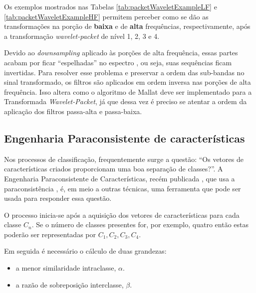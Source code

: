 \documentclass[a4paper,12pt,openright,oneside]{book}
\newenvironment{myenv}[1]
  {\begin{spacing}{#1}}
  {\end{spacing}}
\begin{document}
\begin{myenv}{1.5}
							\par Os exemplos mostrados nas Tabelas \ref{tab:packetWaveletExampleLF} e \ref{tab:packetWaveletExampleHF} permitem perceber como se dão as transformações na porção de \textbf{baixa} e de \textbf{alta} frequências, respectivamente, após a transformação \textit{wavelet-packet} de nível 1, 2, 3 e 4.
							
							\par Devido ao \textit{downsampling} aplicado às porções de alta frequência, essas partes acabam por ficar ``espelhadas'' no espectro \cite{Jensen_2001}, ou seja, suas sequências ficam invertidas. Para resolver esse problema e preservar a ordem das sub-bandas no sinal transformado, os filtros são aplicados em ordem inversa nas porções de alta frequência. Isso altera como o algoritmo de Mallat deve ser implementado para a Transformada \textit{Wavelet-Packet}, já que dessa vez é preciso se atentar a ordem da aplicação dos filtros passa-alta e passa-baixa.
							
							
				
				\subsection{Engenharia Paraconsistente de características}
					\par Nos processos de classificação, frequentemente surge a questão: ``Os vetores de características criados proporcionam uma boa separação de classes?''. A Engenharia Paraconsistente de Características, recém publicada \cite{8588433}, que usa a paraconsistência \cite{da1998elementos},  \cite{COSTA2000} é, em meio a outras técnicas, uma ferramenta que pode ser usada para responder essa questão.
					
					\par O processo inicia-se após a aquisição dos vetores de características para cada classe $C_n$. Se o número de classes presentes for, por exemplo, quatro então estas poderão ser representadas por $C_1, C_2, C_3, C_4$.
					\par Em seguida é necessário o cálculo de duas grandezas:
					
					\begin{itemize}
						\item a menor similaridade intraclasse, $\alpha$.
						\item a razão de sobreposição interclasse, $\beta$.
					\end{itemize}
					

\end{myenv}
\end{document}
